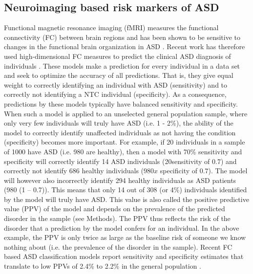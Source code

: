 \documentclass[9pt,lineno]{elife}
\begin{document}
\subsection{Neuroimaging based risk markers of ASD}
Functional magnetic resonance imaging (fMRI) measures the functional connectivity (FC) between brain regions and has been shown to be sensitive to changes in the functional brain organization in ASD \citep{Castellanos2013-tw,Holiga2019-ub}. Recent work has therefore used high-dimensional FC measures to predict the clinical ASD diagnosis of individuals \citep{Abraham2017-vf,Heinsfeld2018-yl,Yahata2016-jk}. These models make a prediction for every individual in a data set and seek to optimize the accuracy of all predictions. That is, they give equal weight to correctly identifying an individual with ASD (sensitivity) and to correctly not identifying a NTC individual (specificity). As a consequence, predictions by these models typically have balanced sensitivity and specificity. When such a model is applied to an unselected general population sample, where only very few individuals will truly have ASD (i.e. 1 - 2\%), the ability of the model to correctly identify unaffected individuals as not having the condition (specificity) becomes more important. For example, if 20 individuals in a sample of 1000 have ASD (i.e. 980 are healthy), then a model with 70\% sensitivity and specificity will correctly identify 14 ASD individuals (20sensitivity of 0.7) and correctly not identify 686 healthy individuals ($980 x $ specificity of $0.7$). The model will however also incorrectly identify 294 healthy individuals as ASD patients (980 (1 – 0.7)). This means that only 14 out of 308 (or 4\%) individuals identified by the model will truly have ASD. This value is also called the positive predictive value (PPV) of the model and depends on the prevalence of the predicted disorder in the sample (see Methods). The PPV thus reflects the risk of the disorder that a prediction by the model confers for an individual. In the above example, the PPV is only twice as large as the baseline risk of someone we know nothing about (i.e. the prevalence of the disorder in the sample). Recent FC based ASD classification models report sensitivity and specificity estimates that translate to low PPVs of 2.4\% to 2.2\% in the general population \citep{Abraham2017-vf,Heinsfeld2018-yl}.
\end{document}
